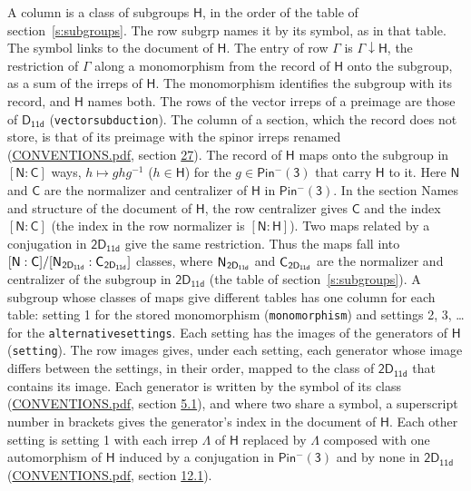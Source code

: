 \documentclass[10pt,a4paper]{article}
\numberwithin{equation}{section}
\newcommand{\grp}[1]{\mathsf{#1}}
\newcommand{\grpindex}[2]{[#1 : #2]}
\newcommand{\restr}[2]{#1\!\downarrow#2}
\newcommand{\hairsp}{\mkern1mu}
\begin{document}
A column is a class of subgroups $\grp{H}$, in the order of the table of section~\ref{s:subgroups}. The row subgrp names it by its symbol, as in that table. The symbol links to the document of $\grp{H}$. The entry of row $\Gamma$ is $\restr{\Gamma}{\grp{H}}$, the restriction of $\Gamma$ along a monomorphism from the record of $\grp{H}$ onto the subgroup, as a sum of the irreps of $\grp{H}$. The monomorphism identifies the subgroup with its record, and $\grp{H}$ names both. The rows of the vector irreps of a preimage are those of \href{../../../rotation/data/pdf/D11d.pdf}{$\grp{D_{11d}}$} (\texttt{vectorsubduction}). The column of a section, which the record does not store, is that of its preimage with the spinor irreps renamed (\href{../../CONVENTIONS.pdf}{CONVENTIONS.pdf}, section \href{../../CONVENTIONS.pdf\#conv.27}{27}). \label{n:group.normalizer.o3}\label{n:group.centralizer.o3}\label{n:element.h}The record of $\grp{H}$ maps onto the subgroup in $\grpindex{\grp{N}}{\grp{C}}$ ways, $h \mapsto g h g^{-1}$ ($h \in \grp{H}$) for the $g \in \grp{Pin^{-}(3)}$ that carry $\grp{H}$ to it. Here $\grp{N}$ and $\grp{C}$ are the normalizer and centralizer of $\grp{H}$ in \href{Pinminus3.pdf}{$\grp{Pin^{-}(3)}$}. In the section Names and structure of the document of $\grp{H}$, the row centralizer gives $\grp{C}$ and the index $\grpindex{\grp{N}}{\grp{C}}$ (the index in the row normalizer is $\grpindex{\grp{N}}{\grp{H}}$). Two maps related by a conjugation in $\grp{2D_{11d}}$ give the same restriction. Thus the maps fall into $\grpindex{\grp{N}}{\grp{C}}/\grpindex{\grp{N}_{\hairsp \grp{2D_{11d}}}}{\grp{C}_{\hairsp \grp{2D_{11d}}}}$ classes, where $\grp{N}_{\hairsp \grp{2D_{11d}}}$ and $\grp{C}_{\hairsp \grp{2D_{11d}}}$ are the normalizer and centralizer of the subgroup in $\grp{2D_{11d}}$ (the table of section~\ref{s:subgroups}). \label{n:head.setting}A subgroup whose classes of maps give different tables has one column for each table: setting 1 for the stored monomorphism (\texttt{monomorphism}) and settings 2, 3, \dots{} for the \texttt{alternativesettings}. Each setting has the images of the generators of $\grp{H}$ (\texttt{setting}). \label{n:head.images}The row images gives, under each setting, each generator whose image differs between the settings, in their order, mapped to the class of $\grp{2D_{11d}}$ that contains its image. Each generator is written by the symbol of its class (\href{../../CONVENTIONS.pdf}{CONVENTIONS.pdf}, section \href{../../../rotation/CONVENTIONS.pdf\#conv.5.1}{5.1}), and where two share a symbol, a superscript number in brackets gives the generator's index in the document of $\grp{H}$. \label{n:irrep.Delta}Each other setting is setting 1 with each irrep $\Lambda$ of $\grp{H}$ replaced by $\Lambda$ composed with one automorphism of $\grp{H}$ induced by a conjugation in \href{Pinminus3.pdf}{$\grp{Pin^{-}(3)}$} and by none in $\grp{2D_{11d}}$ (\href{../../CONVENTIONS.pdf}{CONVENTIONS.pdf}, section \href{../../../rotation/CONVENTIONS.pdf\#conv.12.1}{12.1}).
\end{document}
